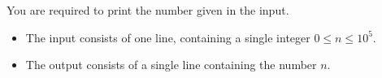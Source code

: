 \documentclass{bapc}
\begin{document}

\newcommand{\maxn}{10^5}

You are required to print the number given in the input.

\begin{Input}
	\begin{itemize}
		\item The input consists of one line, containing a single integer $0\leq n\leq \maxn$.
	\end{itemize}
\end{Input}

\begin{Output}
	\begin{itemize}
		\item The output consists of a single line containing the number $n$.
	\end{itemize}
\end{Output}

\end{document}
